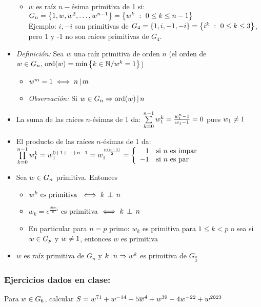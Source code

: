 \begin{itemize}
\begin{itemize}
		      \item $w$ es raíz $n-$ésima primitiva de 1 si:
		            $G_n = \set{1,w,w^2,\dots,w^{n-1}} =
			            \set{w^k\ :\ 0\leq k \leq n-1}$\\
		            Ejemplo: $i, -i$ son primitivas de $G_4 = \set{1,i,-1,-i} = \set{i^k\ :\ 0 \leq k \leq 3}$, pero 1 y -1 no son raíces primitivas de $G_4$.
	      \end{itemize}
	\item \textit{Definición: }
	      Sea $w$ una raíz primitiva de orden $n$ (el orden de
	      $w \en G_n,\, \text{ord}(w) = \text{min}\set{k \en \naturales / w^k = 1}$)
	      \begin{itemize}
		      \item $w^m = 1 \sisolosi n \divideA m$
		      \item \textit{Observación: } Si $w \en G_n \entonces \ord(w) \divideA n$
	      \end{itemize}
	\item La suma de las raíces $n$-ésimas de 1 da:
	      $\sumatoria{k=0}{n-1}w_1^k = \frac{w_1^n -1}{w_1 -1} = 0$ pues $w_1 \distinto 1$
	\item El producto de las raíces $n$-ésimas de 1 da:
	      $\productoria{k=0}{n-1} w_1^k = w_1^{0+1+\dots + n-1} =
		      w_1^{\frac{n(n-1)}{2}} =
		      \llave{rl}{
			      1 & \text{si $n$ es impar}\\
			      -1 & \text{si $n$ es par}
		      }$
	\item Sea $w \en G_n$ primitiva. Entonces
	      \begin{itemize}
		      \item $w^k \text{ es primitiva } \sisolosi k \cop n $
		      \item $w_k = e^{\frac{2k\pi}{n}i}$ es primitiva $\sisolosi k \cop n$
		      \item En particular para $n = p$ primo: $w_k$ es primitiva para $1\leq k < p$ o sea si
		            $w \en G_p$ y $w \distinto 1$, entonces $w$ es primitiva
	      \end{itemize}
	\item $w$ es raíz primitiva de $G_n$ y $k \divideA n \entonces w^k$ es primitiva de $G_\frac{n}{k}$
\end{itemize}

\subsubsection*{Ejercicios dados en clase:}
\ejercicio
Para $w \en G_6$, calcular $S = w^{71} + w^{-14} + 5\conj w^4 + w^{39} - 4w^{-22} + w^{2023}$


